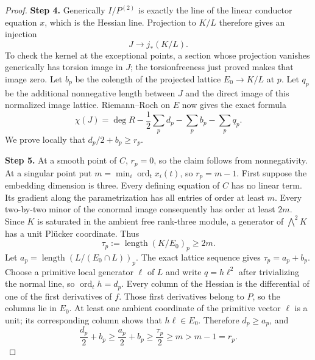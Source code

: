 \begin{proof}
\noindent\textbf{Step 4.} Generically $I/P^{(2)}$ is exactly the line of the linear
conductor equation $x$, which is the Hessian line. Projection
to $K/L$ therefore gives an injection
\[
 J\longrightarrow j_*(K/L).
\]
To check the kernel at the exceptional points, a section whose
projection vanishes generically has torsion image in $J$; the
torsionfreeness just proved makes that image zero. Let $b_p$ be
the colength of the projected lattice $E_0\to K/L$ at $p$.
Let $q_p$ be the additional nonnegative length between $J$ and
the direct image of this normalized image lattice. Riemann--Roch
on $E$ now gives the exact formula
\[
 \chi(J)=\deg R-\frac12\sum_p d_p-\sum_p b_p-\sum_p q_p.
\]
We prove locally that $d_p/2+b_p\geq r_p$.

\noindent\textbf{Step 5.} At a smooth point of $C$, $r_p=0$, so the claim follows from
nonnegativity. At a singular point put
$m=\min_i\operatorname{ord}_t x_i(t)$, so $r_p=m-1$.
First suppose the embedding dimension is three. Every defining
equation of $C$ has no linear term. Its gradient along the
parametrization has all entries of order at least $m$.
Every two-by-two minor of the conormal image consequently has
order at least $2m$. Since $K$ is saturated in the ambient free
rank-three module, a generator of $\bigwedge^2K$ has a unit
Pl\"ucker coordinate. Thus
\[
 \tau_p:=\operatorname{length}(K/E_0)_p\geq2m.
\]
Let $a_p=\operatorname{length}(L/(E_0\cap L))_p$.
The exact lattice sequence gives $\tau_p=a_p+b_p$.
Choose a primitive local generator $\ell$ of $L$ and write
$q=h\ell^2$ after trivializing the normal line, so
$\operatorname{ord}_t h=d_p$.
Every column of the Hessian is the differential of one of
the first derivatives of $f$. Those first derivatives belong
to $P$, so the columns lie in $E_0$. At least one ambient
coordinate of the primitive vector $\ell$ is a unit; its
corresponding column shows that $h\ell\in E_0$.
Therefore $d_p\geq a_p$, and
\[
 \frac{d_p}{2}+b_p\geq\frac{a_p}{2}+b_p
 \geq\frac{\tau_p}{2}\geq m>m-1=r_p.
\]


\end{proof}
